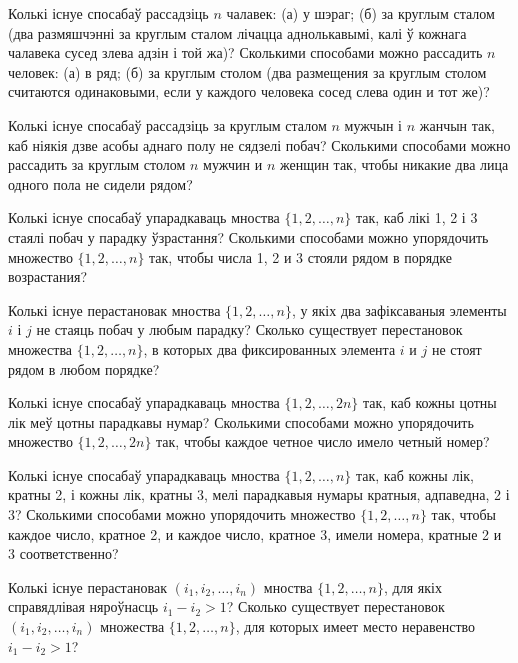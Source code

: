 \begin{problemList}
\bigskip

\problemItemSimple
{Колькі існуе спосабаў рассадзіць $n$ чалавек: (а) у шэраг;
(б) за круглым сталом (два размяшчэнні за круглым сталом лічацца аднолькавымі,
калі ў кожнага чалавека сусед злева адзін і той жа)?}
{Сколькими способами можно рассадить $n$ человек: (а) в ряд; (б) за
круглым столом (два размещения за круглым столом считаются
одинаковыми, если у каждого человека сосед слева один и тот же)?}

\bigskip

\problemItemSimple
{Колькі існуе спосабаў рассадзіць за круглым сталом $n$ мужчын і $n$ жанчын так,
каб ніякія дзве асобы аднаго полу не сядзелі побач?}
{Сколькими способами можно рассадить за круглым столом $n$ мужчин и
$n$ женщин так, чтобы никакие два лица одного пола не сидели рядом?}

\bigskip

\problemItemSimple
{Колькі існуе спосабаў упарадкаваць мноства $\{1, 2, \ldots, n\}$ так,
каб лікі 1, 2 і 3 стаялі побач у парадку ўзрастання?}
{Сколькими способами можно упорядочить множество $\{1, 2, \ldots, n\}$
так, чтобы числа 1, 2 и 3 стояли рядом в порядке возрастания?}

\bigskip

\problemItemSimple
{Колькі існуе перастановак мноства $\{1, 2, \ldots, n\}$, у якіх два зафіксаваныя
элементы $i$ і $j$ не стаяць побач у любым парадку?}
{Сколько существует перестановок множества $\{1, 2, \ldots, n\}$, в
которых два фиксированных элемента $i$ и $j$ не стоят рядом в любом
порядке?}

\bigskip

\problemItemSimple
{Колькі існуе спосабаў упарадкаваць мноства $\{1, 2, \ldots, 2n\}$ так,
каб кожны цотны лік меў цотны парадкавы нумар?}
{Сколькими способами можно упорядочить множество $\{1, 2, \ldots, 2n\}$
так, чтобы каждое четное число имело четный номер?}

\bigskip

\problemItemSimple
{Колькі існуе спосабаў упарадкаваць мноства $\{1, 2, \ldots, n\}$ так,
каб кожны лік, кратны 2, і кожны лік, кратны 3, мелі парадкавыя нумары кратныя,
адпаведна, 2 і 3?}
{Сколькими способами можно упорядочить множество $\{1, 2, \ldots, n\}$
так, чтобы каждое число, кратное 2, и каждое число, кратное 3, имели
номера, кратные 2 и 3 соответственно?}

\bigskip

\problemItemSimple
{Колькі існуе перастановак $(i_1, i_2, \ldots, i_n)$ мноства $\{1, 2, \ldots, n\}$,
для якіх справядлівая няроўнасць $i_1 - i_2 > 1$?}
{Сколько существует перестановок $(i_1, i_2, \ldots, i_n)$ множества
$\{1, 2, \ldots, n\}$, для которых имеет место неравенство
$i_1 - i_2 > 1$?}

\end{problemList}

